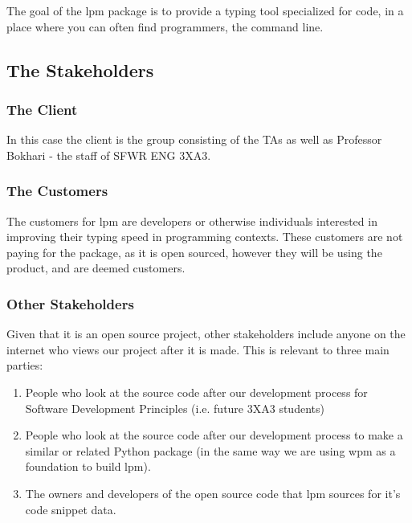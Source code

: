 \documentclass[12pt, titlepage]{article}
\begin{document}
The goal of the lpm package is to provide a typing tool specialized for code, in a place where you can often find programmers, the command line.

\subsection{The Stakeholders}
\subsubsection{The Client}
In this case the client is the group consisting of the TAs as well as Professor Bokhari - the staff of SFWR ENG 3XA3.
\subsubsection{The Customers}
The customers for lpm are developers or otherwise individuals interested in improving their typing speed in programming contexts. These customers are not paying for the package, as it is open sourced, however they will be using the product, and are deemed customers.
\subsubsection{Other Stakeholders}
Given that it is an open source project, other stakeholders include anyone on the internet who views our project after it is made. This is relevant to three main parties:
\begin{enumerate}
    \item People who look at the source code after our development process for Software Development Principles (i.e. future 3XA3 students)
    \item People who look at the source code after our development process to make a similar or related Python package (in the same way we are using wpm as a foundation to build lpm).
    \item The owners and developers of the open source code that lpm sources for it's code snippet data.
\end{enumerate}
\end{document}
